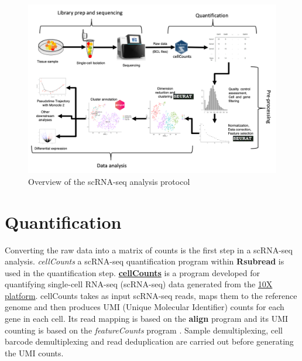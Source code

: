 \documentclass[
  openany]{book}
\begin{document}
\begin{landscape}
\begin{figure}

{\centering \includegraphics[width=26.67in]{Fig1} 

}

\caption{Overview of the scRNA-seq analysis protocol}\label{fig:fig1}
\end{figure}
\end{landscape}

\hypertarget{quantification}{%
\section{Quantification}\label{quantification}}

Converting the raw data into a matrix of counts is the first step in a scRNA-seq analysis. \emph{cellCounts} a scRNA-seq quantification program within \textbf{Rsubread} is used in the quantification step. \href{https://rdrr.io/bioc/Rsubread/man/cellCounts.html}{\textbf{cellCounts}} is a program developed for quantifying single-cell RNA-seq (scRNA-seq) data generated from the \href{https://www.10xgenomics.com/products/single-cell-gene-expression}{10X platform}. cellCounts takes as input scRNA-seq reads, maps them to the reference genome and then produces UMI (Unique Molecular Identifier) counts for each gene in each cell. Its read mapping is based on the \textbf{align} program \citep{Rsubread2019, liao2013subread} and its UMI counting is based on the \emph{featureCounts} program \citep{liao2013featurecounts}. Sample demultiplexing, cell barcode demultiplexing and read deduplication are carried out before generating the UMI counts.
\end{document}
